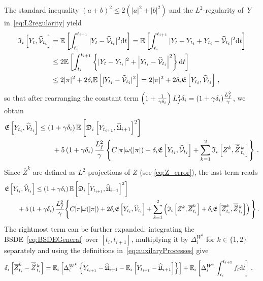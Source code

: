 The standard inequality $(a+b)^2\leq 2(|a|^2+|b|^2)$ and the $L^2$-regularity of~$Y$ in~\eqref{eq:L2regularity} yield
\begin{align*}
\mathfrak{I}_i\left[Y_t, \widehat{\mathcal{V}}_{t_i}\right] 
 & = \mathbb{E}\left[\int_{t_i}^{t_{i+1}}|Y_t - \widehat {\mathcal{V}}_{t_i}|^2\mathrm{d} t\right] = \mathbb{E}\left[\int_{t_i}^{t_{i+1}}|Y_t-Y_{t_i}+Y_{t_i}-\widehat{\mathcal{V}}_{t_i}|^2 \mathrm{d} t\right]\\
  & \leq 2 \mathbb{E}\left[\int_{t_i}^{t_{i+1}}
\left\{|Y_t-Y_{t_i}|^2 + \left|Y_{t_i}-\widehat{\mathcal{V}}_{t_i}\right|^2\right\} \mathrm{d} t\right] \\
 & \leq 2|\pi|^2 + 2\delta_{i}\mathbb{E}\left[|Y_{t_i}-\widehat{\mathcal{V}}_{t_i}|^2\right]
 = 2|\pi|^2 + 2\delta_{i}\mathfrak{E}\left[Y_{t_i}, \widehat{\mathcal{V}}_{t_i}\right]\,,
\end{align*}
so that after rearranging the constant term $\left(1+\frac{1}{\gamma\delta_{i}}\right)L_f^2\delta_{i}=(1+\gamma\delta_{i})\frac{L_f^2}\gamma$,
we obtain
\begin{equation}
\begin{aligned}
\mathfrak{E}\left[Y_{t_i}, \widehat{\mathcal{V}}_{t_i}\right] &\leq \left(1+\gamma \delta_{i} \right) \mathbb{E}\left[\mathfrak{D}_i\left[Y_{t_{i+1}}, \widehat{\mathfrak{U}}_{i+1}\right]^{2}\right] \\
 & \qquad + 5\left(1+\gamma \delta_{i} \right) \frac{L_f^2}{\gamma}\left\{
C |\pi| \omega(|\pi|) + \delta_{i}  \mathfrak{E}\left[Y_{t_i}, \widehat{\mathcal{V}}_{t_i}\right]
+ \sum_{k=1}^{2}\mathfrak{I}_i\left[Z^k, \overline{\widehat{Z}}\kern0.1em^{k}_{t_i}\right]\right\}\,.
\end{aligned}
\end{equation}
Since $\overline{Z}^k$ are defined as $L^2$-projections of $Z$ (see \eqref{eq:Z_error}), the last term reads
\begin{align}\label{eq:convergence_part1}
\begin{split}
& \mathfrak{E}\left[Y_{t_i}, \widehat{\mathcal{V}}_{t_i}\right] \leq\left(1+\gamma \delta_{i} \right) \mathbb{E}\left[\mathfrak{D}_i\left[Y_{t_{i+1}}, \widehat{\mathfrak{U}}_{i+1}\right]^2\right] \\
 & \qquad + 5\left(1+\gamma \delta_{i} \right) \frac{L_f^2}{\gamma}\Bigg\{C |\pi| \omega(|\pi|) + 2 \delta_{i}  \mathfrak{E}\left[Y_{t_i}, \widehat{\mathcal{V}}_{t_i}\right] 
+ \sum_{k=1}^2\left(\mathfrak{I}_i\left[Z^k, \overline{Z}^{k}_{t_i}\right] + \delta_{i} \mathfrak{E}\left[\overline{Z}^k_{t_i}, \overline{\widehat{Z}}\kern0.1em^{k}_{t_i}\right] \right)\Bigg\}\,.
\end{split}
\end{align}
The rightmost term can be further expanded:
integrating the BSDE~\eqref{eq:BSDEGeneral} over $[t_i, t_{i+1}]$, multiplying it by $\Delta^{W^k}_{i}$ for $k\in\{1,2\}$ separately and using the definitions in~\eqref{eq:auxilaryProcesses} give
\begin{align}
\delta_{i} \left[\overline{Z}^k_{t_i}-\overline{\widehat{Z}}\kern0.1em^{k}_{t_{i}}\right] &= \mathbb{E}_i\left[\Delta^{W^k}_{i}\left\{Y_{t_{i+1}}-\widehat{\mathfrak{U}}_{i+1}-\mathbb{E}_i\left[Y_{t_{i+1}}-\widehat{\mathfrak{U}}_{i+1}\right]\right\}\right] 
+ \mathbb{E}_i\left[\Delta^{W^k}_{i} \int_{t_i}^{t_{i+1}} f_{t}\mathrm{d} t\right]\,.
\end{align}
